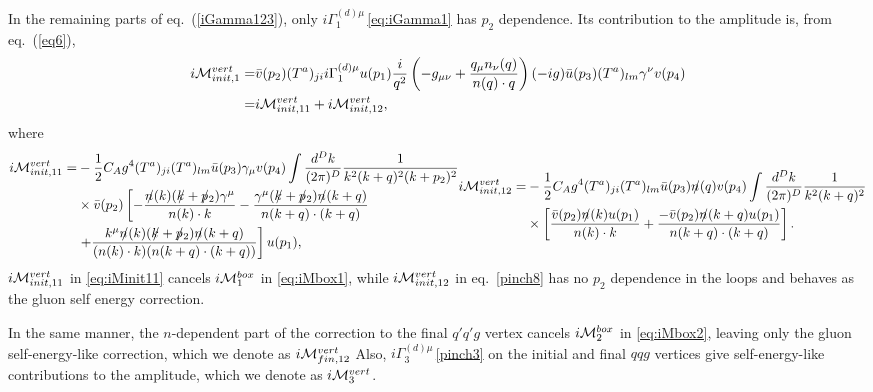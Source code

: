 \documentclass[preprint,amsmath,amssymb,superscriptaddress, floatfix,nofootinbib]{revtex4}
\def\psla{p\kern-.45em/}
\def\ksla{k\kern-.45em/}
\def\nsla{n\kern-.45em/}
\begin{document}
In the remaining parts of eq.~(\ref{iGamma123}), only $i\Gamma^{(d)\mu}_1$\,\eqref{eq:iGamma1} has 
$p_2$ dependence. Its contribution to the amplitude is, from eq.~(\ref{eq6}), 
%
\begin{align}
i{\cal M}^{vert}_{init,1} =  &  \bar{v}(p_2)(T^a)_{ji}i\Gamma^{(d)\mu}_1u(p_1)
\frac{i}{q^2} \left( -g_{\mu\nu} + \frac{q_{\mu} n_{\nu}(q)}{n(q)\cdot q} \right)
(-ig)\bar{u}(p_3)(T^a)_{lm}\gamma^{\nu}v(p_4) 
\nonumber \\ 
= &  i{\cal M}^{vert}_{init,11}+ i{\cal M}^{vert}_{init,12}  ,
\end{align}
%
where
\begin{subequations}
\begin{align}
i{\cal M}^{vert}_{init, 11} = & 
 -\frac{1}{2}C_A g^4 (T^a)_{ji}(T^a)_{lm} 
 \bar{u}(p_3)\gamma_{\mu}v(p_4) 
 \int \frac{d^D k}{(2\pi)^D} 
\frac{1}{k^2(k+q)^2(k+p_2)^2}
\nonumber \\
& \times \bar{v}(p_2) \left[ 
- \frac{ \nsla(k)(\ksla+\psla_2)\gamma^{\mu}  }
{n(k)\cdot k}  
- \frac{ \gamma^{\mu} (\ksla+\psla_2)\nsla(k+q)  } {n(k+q)\cdot(k+q)}  \right. 
\nonumber \\ 
& \left. 
+\frac{  k^{\mu} \nsla(k)(\ksla+\psla_2)\nsla(k+q) 
 } {(n(k)\cdot k)(n(k+q)\cdot (k+q))}
\right]  u(p_1) ,
\label{eq:iMinit11}
\end{align}    
%
\begin{align}
i{\cal M}^{vert}_{init,12} =
&  -\frac{1}{2}C_A g^4 (T^a)_{ji}(T^a)_{lm} 
\bar{u}(p_3) \nsla(q) v(p_4) 
\int \frac{d^D k}{(2\pi)^D} \frac{1}{k^2(k+q)^2}
\nonumber \\
& \times \left[ 
\frac{ \bar{v}(p_2) \nsla(k) u(p_1) }
{n(k)\cdot k}  
+ \frac{ -\bar{v}(p_2) \nsla(k+q) u(p_1)  } {n(k+q)\cdot(k+q)}  \right] 
 . 
\label{pinch8}
\end{align}
\end{subequations}
%
$i{\cal M}^{vert}_{init,11}$ in \eqref{eq:iMinit11} cancels $i{\cal M}^{box}_1$ in \eqref{eq:iMbox1}, 
while $i{\cal M}^{vert}_{init,12}$ in eq.~\eqref{pinch8} has no $p_2$ dependence in the loops 
and behaves as the gluon self energy correction. 

In the same manner, the $n$-dependent part of the correction 
to the final $q'{q}'g$ vertex cancels  $i{\cal M}^{box}_2$ in \eqref{eq:iMbox2}, 
leaving only the gluon self-energy-like correction, 
which we denote as $i{\cal M}^{vert}_{fin,12}$
Also, $i\Gamma^{(d)\mu}_3$\,\eqref{pinch3} on the initial and final $q{q}g$ vertices 
give self-energy-like contributions to the amplitude, 
which we denote as $i{\cal M}^{vert}_3$. 
\end{document}
